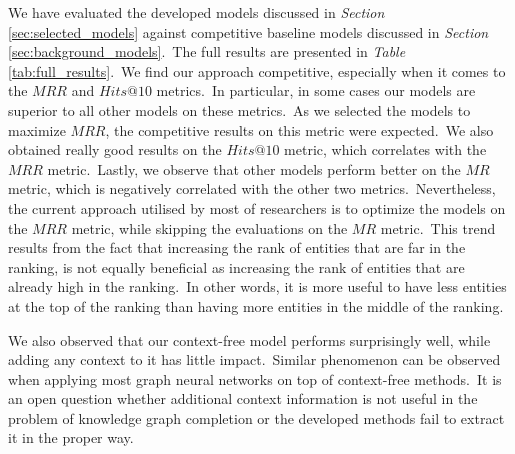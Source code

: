 \documentclass[longabstract, english, mgr]{iithesis}
\theoremstyle{default_theorem_style}\newtheorem{theorem}{Theorem}
\theoremstyle{default_theorem_style}\newtheorem{definition}{Definition}
\begin{document}
\noindent We have evaluated the developed models discussed in \textit{Section} \ref{sec:selected_models} against
competitive baseline models discussed in \textit{Section} \ref{sec:background_models}.\ The full results are presented
in \textit{Table} \ref{tab:full_results}.\ We find our approach competitive, especially when it comes to
the $MRR$ and $Hits@10$ metrics.\ In particular, in some cases our models are superior to all other models on these
metrics.\ As we selected the models to maximize $MRR$, the competitive results on this metric were expected.\ We also
obtained really good results on the $Hits@10$ metric, which correlates with the $MRR$ metric.\ Lastly, we observe that
other models perform better on the $MR$ metric, which is negatively correlated with the other two
metrics.\ Nevertheless, the current approach utilised by most of researchers is to optimize the models on the $MRR$
metric, while skipping the evaluations on the $MR$ metric.\ This trend results from the fact that increasing the rank
of entities that are far in the ranking, is not equally beneficial as increasing the rank of entities that are already
high in the ranking.\ In other words, it is more useful to have less entities at the top of the ranking than having
more entities in the middle of the ranking.\newline

\noindent We also observed that our context-free model performs surprisingly well, while adding any context to it
has little impact.\ Similar phenomenon can be observed when applying most graph neural networks on top of
context-free methods.\ It is an open question whether additional context information is not useful in the problem
of knowledge graph completion or the developed methods fail to extract it in the proper way.
\end{document}

